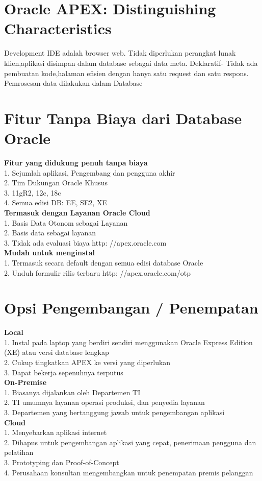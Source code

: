 \documentclass[12pt, times new roman, a4paper]{article}
\begin{document}
\section{Oracle APEX: Distinguishing Characteristics}
Development IDE adalah browser web. Tidak diperlukan perangkat lunak klien,aplikasi disimpan dalam database sebagai data meta. Deklaratif- Tidak ada pembuatan kode,halaman efisien dengan hanya satu request dan satu respons. Pemrosesan data dilakukan dalam Database\\

\section{Fitur Tanpa Biaya dari Database Oracle}
\textbf{Fitur yang didukung penuh tanpa biaya} \\
1. Sejumlah aplikasi, Pengembang dan pengguna akhir\\
2. Tim Dukungan Oracle Khusus\\
3. 11gR2, 12c, 18c\\
4. Semua edisi DB: EE, SE2, XE\\
\textbf{Termasuk dengan Layanan Oracle Cloud}\\
1. Basis Data Otonom sebagai Layanan \\
2. Basis data sebagai layanan \\
3. Tidak ada evaluasi biaya http: //apex.oracle.com \\
\textbf{Mudah untuk menginstal}\\
1. Termasuk secara default dengan semua edisi database Oracle\\
2. Unduh formulir rilis terbaru http: //apex.oracle.com/otp\\

\section{Opsi Pengembangan / Penempatan}
\textbf{Local}\\
1. Instal pada laptop yang berdiri sendiri menggunakan Oracle Express Edition (XE) atau versi database lengkap\\
2. Cukup tingkatkan APEX ke versi yang diperlukan\\
3. Dapat bekerja sepenuhnya terputus\\
\textbf{On-Premise}\\
1. Biasanya dijalankan oleh Departemen TI\\
2. TI umumnya layanan operasi produksi, dan penyedia layanan\\
3. Departemen yang bertanggung jawab untuk pengembangan aplikasi\\
\textbf{Cloud}\\
1. Menyebarkan aplikasi internet\\
2. Dihapus untuk pengembangan aplikasi yang cepat, penerimaan pengguna dan pelatihan\\
3. Prototyping dan Proof-of-Concept\\
4. Perusahaan konsultan mengembangkan untuk penempatan premis pelanggan\\
\end{document}
